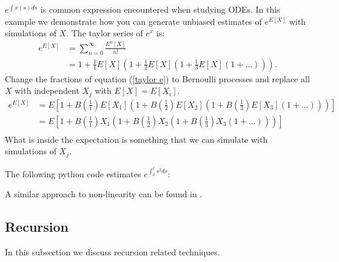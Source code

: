 \documentclass[a4paper,12pt]{article}
\begin{document}
\begin{example}[$e^{E[X]}$]
    $e^{\int x(s)ds}$ is common expression encountered when studying ODEs.
    In this example we demonstrate how you can generate unbiased estimates of
    $e^{E[X]}$ with simulations of $X$. The taylor series of $e^{x}$ is:
    \begin{align}
        e^{E[X]} & = \sum_{n=0}^{\infty} \frac{E^{n}[X]}{n!}     \\
                 & = 1 + \frac{1}{1}E[X]\left(1+ \frac{1}{2}E[X]
        \left(1+\frac{1}{3}E[X]\left(1+ ...\right)\right)\right). \label{taylor e}
    \end{align}
    Change the fractions of equation (\ref{taylor e}) to Bernoulli processes
    and replace all $X$ with independent $X_j$ with $E[X]=E[X_{i}]$.
    \begin{align}
        e^{E[X]} & = E
        \left[1 + B\left(\frac{1}{1}\right)E[X_1]
        \left(1+ B\left(\frac{1}{2}\right)E[X_2]
        \left(1+B\left(\frac{1}{3}\right)E[X_3]
        \left(1+ ...\right)
        \right)
        \right)
        \right]              \\
                 & = E\left[
            1 + B\left(\frac{1}{1}\right)X_1
            \left(1+ B\left(\frac{1}{2}\right)X_2
            \left(1+B\left(\frac{1}{3}\right)X_3
            \left(1+ ...\right)
            \right)
            \right)
        \right]              \\
    \end{align}
    What is inside the expectation is something that we can simulate with simulations of $X_{j}$.
\end{example}

\vspace{0.2cm}
\begin{pythonn}[$e^{E[X]}$]
    The following python code estimates $e^{\int_{0}^{t} s^{2}ds}$:
    \vspace*{0.4cm}
\end{pythonn}

\begin{related}
    A similar approach to non-linearity can be found in \cite{ermakov_monte_2019}.
\end{related}

\subsection{Recursion}
In this subsection we discuss recursion related techniques.
\end{document}
